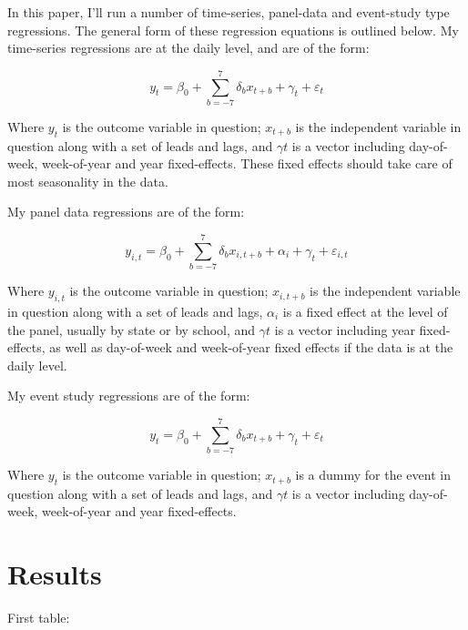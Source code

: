 \documentclass[AER,draftmode]{AEA}
\begin{document}
In this paper, I'll run a number of time-series, panel-data and event-study type regressions. The general form of these regression equations is outlined below. My time-series regressions are at the daily level, and are of the form: 

$$ 
y_{t} = \beta_{0} + \sum_{b=-7}^{7} \delta_{b} x_{t+b} + \gamma_{t} + \varepsilon_{t}
$$

Where $y_{t}$ is the outcome variable in question; $x_{t+b}$ is the independent variable in question along with a set of leads and lags, and $\gamma{t}$ is a vector including day-of-week, week-of-year and year fixed-effects. These fixed effects should take care of most seasonality in the data. 

My panel data regressions are of the form:

$$ 
y_{i,t} = \beta_{0} + \sum_{b=-7}^{7} \delta_{b} x_{i,t+b} + \alpha_{i} + \gamma_{t} + \varepsilon_{i,t}
$$

Where $y_{i,t}$ is the outcome variable in question; $x_{i,t+b}$ is the independent variable in question along with a set of leads and lags, $\alpha_{i}$ is a fixed effect at the level of the panel, usually by state or by school, and $\gamma{t}$ is a vector including year fixed-effects, as well as day-of-week and week-of-year fixed effects if the data is at the daily level.

My event study regressions are of the form:

$$ 
y_{t} = \beta_{0} + \sum_{b=-7}^{7} \delta_{b} x_{t+b} + \gamma_{t} + \varepsilon_{t}
$$

Where $y_{t}$ is the outcome variable in question; $x_{t+b}$ is a dummy for the event in question along with a set of leads and lags, and $\gamma{t}$ is a vector including day-of-week, week-of-year and year fixed-effects.

\section{Results}

First table:

\clearpage
\begin{table}[]
\caption{}

\end{table}

\end{document}
